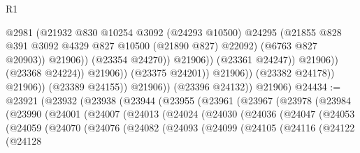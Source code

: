 \begin{lexlean}{R1}
\begin{coremodule}
                                                @2981
                                                (@21932
                                                  @830
                                                  @10254
                                                  @3092
                                                  (@24293 @10500)
                                                  @24295
                                                  (@21855
                                                    @828
                                                    @391
                                                    @3092
                                                    @4329
                                                    @827
                                                    @10500
                                                    (@21890 @827)
                                                    @22092)
                                                  (@6763 @827 @20903))
                                                @21906))
                                            (@23354 @24270))
                                          @21906))
                                      (@23361 @24247))
                                    @21906))
                                (@23368 @24224))
                              @21906))
                          (@23375 @24201))
                        @21906))
                    (@23382 @24178))
                  @21906))
              (@23389 @24155))
            @21906))
        (@23396 @24132))
      @21906)
@24434 := @23921
    (@23932
      (@23938
        (@23944
          (@23955
            (@23961
              (@23967
                (@23978
                  (@23984
                    (@23990
                      (@24001
                        (@24007
                          (@24013
                            (@24024
                              (@24030
                                (@24036
                                  (@24047
                                    (@24053
                                      (@24059
                                        (@24070
                                          (@24076
                                            (@24082
                                              (@24093
                                                (@24099
                                                  (@24105
                                                    (@24116
                                                      (@24122
                                                        (@24128

\end{coremodule}
\end{lexlean}
